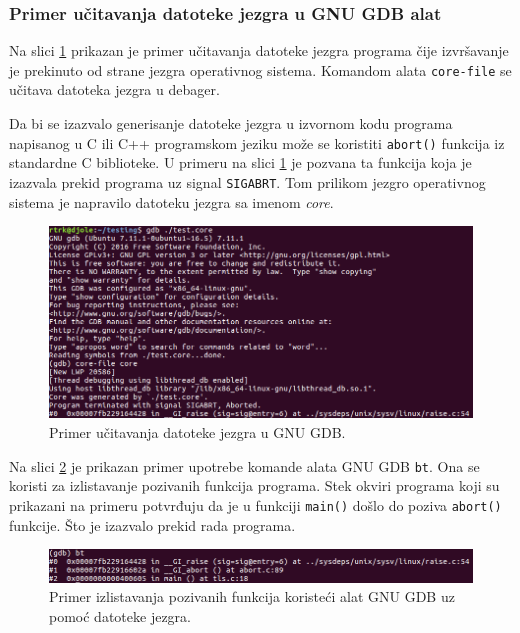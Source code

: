 \documentclass[12pt,oneside]{memoir}
\begin{document}
\subsubsection{Primer učitavanja datoteke jezgra u GNU GDB alat}

Na slici \ref{fig:ucitavanje_core} prikazan je primer učitavanja datoteke jezgra programa čije izvršavanje je prekinuto od strane jezgra operativnog sistema. Komandom alata \texttt{core-file} se učitava datoteka jezgra u debager.

Da bi se izazvalo generisanje datoteke jezgra u izvornom kodu programa napisanog u C ili C++ programskom jeziku može se koristiti \texttt{abort()} funkcija iz standardne C biblioteke. U primeru na slici \ref{fig:ucitavanje_core} je pozvana ta funkcija koja je izazvala prekid programa uz signal \texttt{SIGABRT}. Tom prilikom jezgro operativnog sistema je napravilo datoteku jezgra sa imenom \emph{core}.

\newpage
\begin{figure}[h!]
	\begin{center}
		\includegraphics[scale=0.6]{slike/ucitanje_core.png}
	\end{center}
	\caption{Primer učitavanja datoteke jezgra u GNU GDB.}
	\label{fig:ucitavanje_core}
\end{figure}

Na slici \ref{fig:bt_core} je prikazan primer upotrebe komande alata GNU GDB \texttt{bt}. Ona se koristi za izlistavanje pozivanih funkcija programa. Stek okviri programa koji su prikazani na primeru potvrđuju da je u funkciji \texttt{main()} došlo do poziva \texttt{abort()} funkcije. Što je izazvalo prekid rada programa.

\begin{figure}[h!]
	\begin{center}
		\includegraphics[scale=0.6]{slike/bt_core.png}
	\end{center}
	\caption{Primer izlistavanja pozivanih funkcija koristeći alat GNU GDB uz pomoć datoteke jezgra.}
	\label{fig:bt_core}
\end{figure}
\end{document}
